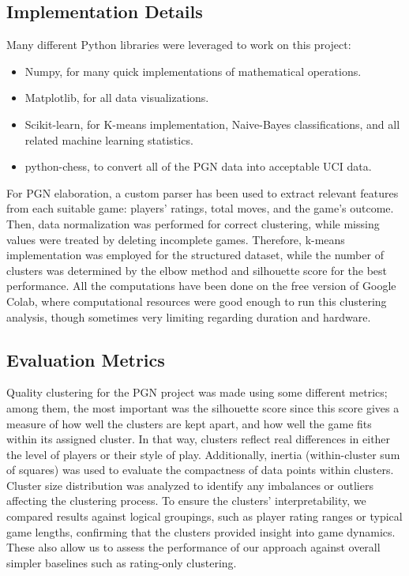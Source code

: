 \documentclass[conference]{IEEEtran}
\begin{document}
\subsection{Implementation Details}
Many different Python libraries were leveraged to work on this project:
\begin{itemize}
\item Numpy, for many quick implementations of mathematical operations.
\item Matplotlib, for all data visualizations.
\item Scikit-learn, for K-means implementation, Naive-Bayes classifications, and all related machine learning statistics.
\item python-chess, to convert all of the PGN data into acceptable UCI data.
\end{itemize}

For PGN elaboration, a custom parser has been used to extract relevant features from each suitable game: players' ratings, total moves, and the game's outcome. Then, data normalization was performed for correct clustering, while missing values were treated by deleting incomplete games. Therefore, k-means implementation was employed for the structured dataset, while the number of clusters was determined by the elbow method and silhouette score for the best performance. All the computations have been done on the free version of Google Colab, where computational resources were good enough to run this clustering analysis, though sometimes very limiting regarding duration and hardware.

\subsection{Evaluation Metrics}
Quality clustering for the PGN project was made using some different metrics; among them, the most important was the silhouette score since this score gives a measure of how well the clusters are kept apart, and how well the game fits within its assigned cluster. In that way, clusters reflect real differences in either the level of players or their style of play. Additionally, inertia (within-cluster sum of squares) was used to evaluate the compactness of data points within clusters. Cluster size distribution was analyzed to identify any imbalances or outliers affecting the clustering process. To ensure the clusters' interpretability, we compared results against logical groupings, such as player rating ranges or typical game lengths, confirming that the clusters provided insight into game dynamics. These also allow us to assess the performance of our approach against overall simpler baselines such as rating-only clustering.
\end{document}
